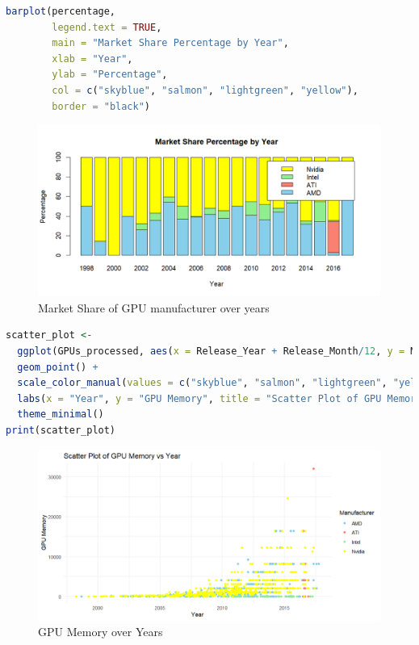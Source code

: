 \begin{lstlisting}[language=R]
barplot(percentage,
        legend.text = TRUE,
        main = "Market Share Percentage by Year",
        xlab = "Year",
        ylab = "Percentage",
        col = c("skyblue", "salmon", "lightgreen", "yellow"),
        border = "black")
\end{lstlisting}

\begin{figure}[ht]
  \centering
  \includegraphics[width=1\linewidth]{img/Market_Percent_Year.png}
  \vspace{1pt}
  \caption{Market Share of GPU manufacturer over years}
\end{figure}

\begin{lstlisting}[language=R]
scatter_plot <- 
  ggplot(GPUs_processed, aes(x = Release_Year + Release_Month/12, y = Memory, color = Manufacturer)) +
  geom_point() +
  scale_color_manual(values = c("skyblue", "salmon", "lightgreen", "yellow")) +
  labs(x = "Year", y = "GPU Memory", title = "Scatter Plot of GPU Memory over Years") +
  theme_minimal()
print(scatter_plot)
\end{lstlisting}

\begin{figure}[ht]
  \centering
  \includegraphics[width=1\linewidth]{img/GPU_Memo_Year.png}
  \vspace{1pt}
  \caption{GPU Memory over Years}
\end{figure}

